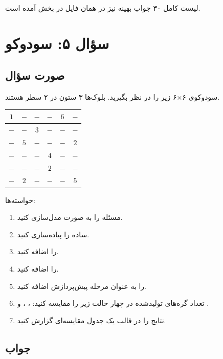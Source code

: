 \documentclass[10.5pt]{exam}
\begin{document}
لیست کامل ۳۰ جواب بهینه نیز در همان فایل
در بخش
آمده است.

\newpage

\section{سؤال ۵: سودوکو}

\subsection*{صورت سؤال}

سودوکوی ۶×۶ زیر را در نظر بگیرید. بلوک‌ها ۳ ستون در ۲ سطر هستند.

\begin{center}
\renewcommand{\arraystretch}{1.4}
\begin{tabular}{|c|c|c||c|c|c|}
\hline
$1$ & $-$ & $-$ & $-$ & $6$ & $-$ \\
\hline
$-$ & $-$ & $3$ & $-$ & $-$ & $-$ \\
\hline\hline
$-$ & $5$ & $-$ & $-$ & $-$ & $2$ \\
\hline
$-$ & $-$ & $-$ & $4$ & $-$ & $-$ \\
\hline\hline
$-$ & $-$ & $-$ & $2$ & $-$ & $-$ \\
\hline
$-$ & $2$ & $-$ & $-$ & $-$ & $5$ \\
\hline
\end{tabular}
\end{center}

خواسته‌ها:
\begin{enumerate}
  \item[الف.] مسئله را به صورت  مدل‌سازی کنید.
  \item[ب.]  ساده را پیاده‌سازی کنید.
  \item[ج.]  را اضافه کنید.
  \item[د.]  را اضافه کنید.
  \item[ه.]  را به عنوان مرحله پیش‌پردازش اضافه کنید.
  \item[و.] تعداد گره‌های تولیدشده در چهار حالت زیر را مقایسه کنید:
  ،
  ،
  و
  .
  \item[ز.] نتایج را در قالب یک جدول مقایسه‌ای گزارش کنید.
\end{enumerate}

\subsection*{جواب}
\end{document}
